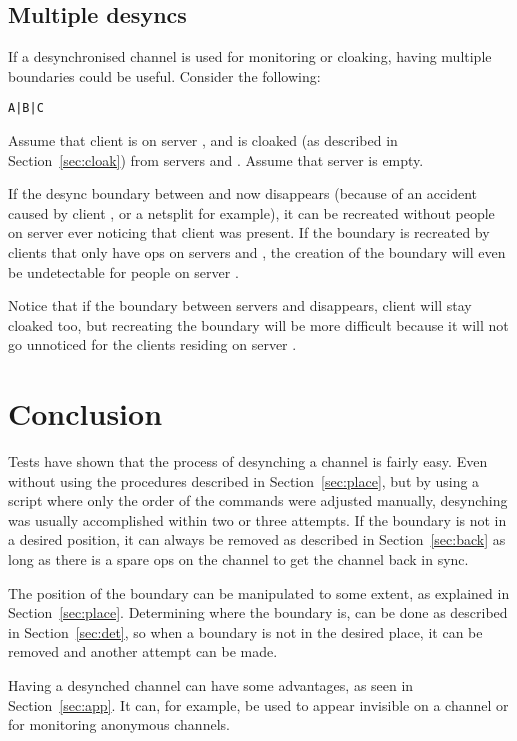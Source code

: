 \documentclass{article}
\theoremstyle{definition}
\begin{document}
\subsection{Multiple desyncs} \label{sec:multi}
If a desynchronised channel is used for monitoring or cloaking, having multiple
boundaries could be useful. Consider the following:
\begin{center}
\verb#A|B|C#
\end{center}
Assume that client  is on server , and is cloaked (as described in
Section~\ref{sec:cloak}) from servers  and . Assume that server  is
empty.

If the desync boundary between  and  now disappears (because of an
accident caused by client , or a netsplit for example), it can be recreated
without people on server  ever noticing that client  was present. If the
boundary is recreated by clients that only have ops on servers  and , the
creation of the boundary will even be undetectable for people on server .

Notice that if the boundary between servers  and  disappears, client 
will stay cloaked too, but recreating the boundary will be more difficult
because it will not go unnoticed for the clients residing on server .

\section{Conclusion} \label{sec:con}
Tests have shown that the process of desynching a channel is fairly easy. Even
without using the procedures described in Section~\ref{sec:place}, but by using
a script where only the order of the commands were adjusted manually,
desynching was usually accomplished within two or three attempts. If the
boundary is not in a desired position, it can always be removed as described in
Section~\ref{sec:back} as long as there is a spare ops on the channel to get
the channel back in sync.

The position of the boundary can be manipulated to some extent, as explained in
Section~\ref{sec:place}. Determining where the boundary is, can be done as
described in Section~\ref{sec:det}, so when a boundary is not in the desired
place, it can be removed and another attempt can be made.

Having a desynched channel can have some advantages, as seen in
Section~\ref{sec:app}. It can, for example, be used to appear invisible on a
channel or for monitoring anonymous channels.
\end{document}
